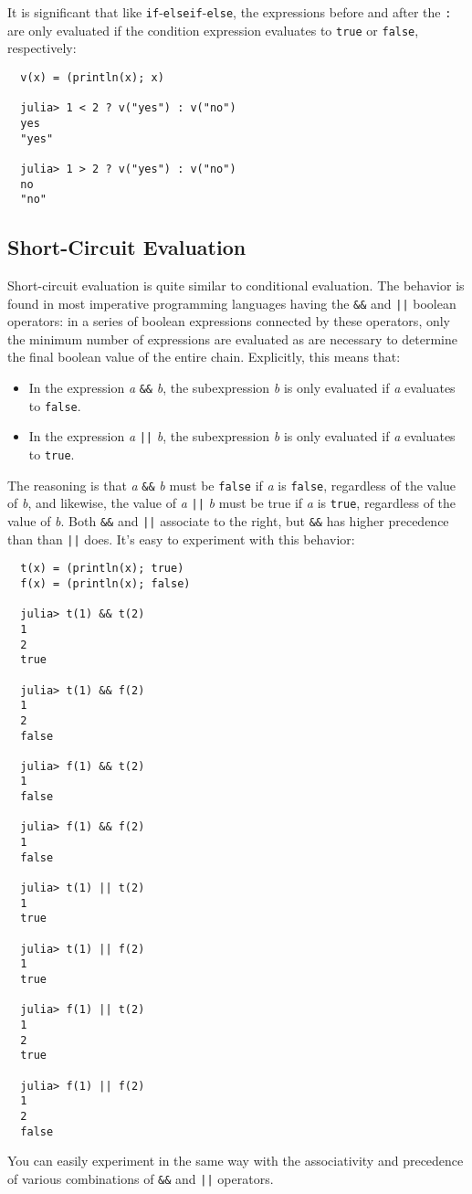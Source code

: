 \documentclass{article}
\renewcommand{\sec}[1]{\label{sec:#1}}
\begin{document}
It is significant that like \verb|if|-\verb|elseif|-\verb|else|, the expressions before and after the \verb|:| are only evaluated if the condition expression evaluates to \verb|true| or \verb|false|, respectively:
\begin{verbatim}
  v(x) = (println(x); x)

  julia> 1 < 2 ? v("yes") : v("no")
  yes
  "yes"

  julia> 1 > 2 ? v("yes") : v("no")
  no
  "no"
\end{verbatim}

\subsection{Short-Circuit Evaluation}\sec{short-circuit-evaluation}

Short-circuit evaluation is quite similar to conditional evaluation.
The behavior is found in most imperative programming languages having the \verb|&&| and \texttt{||} boolean operators:
in a series of boolean expressions connected by these operators, only the minimum number of expressions are evaluated as are necessary to determine the final boolean value of the entire chain.
Explicitly, this means that:
\begin{itemize}
  \item In the expression \emph{a} \verb|&&| \emph{b}, the subexpression \emph{b} is only evaluated if \emph{a} evaluates to \verb|false|.
  \item In the expression \emph{a} \texttt{||} \emph{b}, the subexpression \emph{b} is only evaluated if \emph{a} evaluates to \verb|true|.
\end{itemize}
The reasoning is that \emph{a} \verb|&&| \emph{b} must be \verb|false| if \emph{a} is \verb|false|, regardless of the value of \emph{b}, and likewise, the value of \emph{a} \texttt{||} \emph{b} must be true if \emph{a} is \verb|true|, regardless of the value of \emph{b}.
Both \verb|&&| and \texttt{||} associate to the right, but \verb|&&| has higher precedence than than \texttt{||} does.
It's easy to experiment with this behavior:
\begin{verbatim}
  t(x) = (println(x); true)
  f(x) = (println(x); false)

  julia> t(1) && t(2)
  1
  2
  true

  julia> t(1) && f(2)
  1
  2
  false

  julia> f(1) && t(2)
  1
  false

  julia> f(1) && f(2)
  1
  false

  julia> t(1) || t(2)
  1
  true

  julia> t(1) || f(2)
  1
  true

  julia> f(1) || t(2)
  1
  2
  true

  julia> f(1) || f(2)
  1
  2
  false
\end{verbatim}
You can easily experiment in the same way with the associativity and precedence of various combinations of \verb|&&| and \texttt{||} operators.
\end{document}
